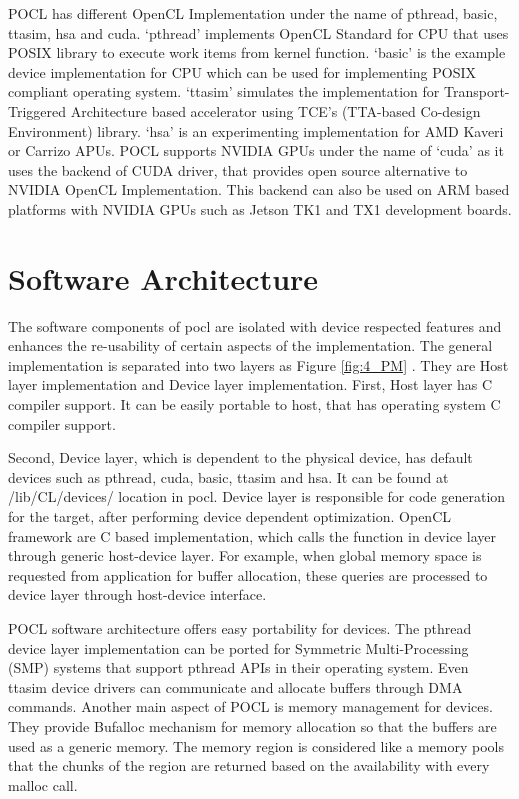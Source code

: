 POCL has different OpenCL Implementation under the name of pthread, basic, ttasim, hsa and cuda. ‘pthread’ implements OpenCL Standard for CPU that uses POSIX library to execute work items from kernel function. ‘basic’ is the example device implementation for CPU which can be used for implementing POSIX compliant operating system. ‘ttasim’ simulates the implementation for Transport-Triggered Architecture based accelerator using TCE’s (TTA-based Co-design Environment) library. ‘hsa’ is an experimenting implementation for AMD Kaveri or Carrizo APUs. POCL supports NVIDIA GPUs under the name of ‘cuda’ as it uses the backend of CUDA driver, that provides open source alternative to NVIDIA OpenCL Implementation. This backend can also be used on ARM based platforms with NVIDIA GPUs such as Jetson TK1 and TX1 development boards.
 
\section{Software Architecture}
The software components of pocl are isolated with device respected features and enhances the re-usability of certain aspects of the implementation. The general implementation is separated into two layers as Figure \ref{fig:4_PM} \cite{18}. They are Host layer implementation and Device layer implementation. First, Host layer has C compiler support. It can be easily portable to host, that has operating system C compiler support.


Second, Device layer, which is dependent to the physical device, has default devices such as pthread, cuda, basic, ttasim and hsa. It can be found at /lib/CL/devices/ location in pocl. Device layer is responsible for code generation for the target, after performing device dependent optimization. OpenCL framework are C based implementation, which calls the function in device layer through generic host-device layer. For example, when global memory space is requested from application for buffer allocation, these queries are processed to device layer through host-device interface.

POCL software architecture offers easy portability for devices. The pthread device layer implementation can be ported for Symmetric Multi-Processing (SMP) systems that support pthread APIs in their operating system. Even ttasim device drivers can communicate and allocate buffers through DMA commands. Another main aspect of POCL is memory management for devices. They provide Bufalloc mechanism for memory allocation so that the buffers are used as a generic memory. The memory region is considered like a memory pools that the chunks of the region are returned based on the availability with every malloc call. 

